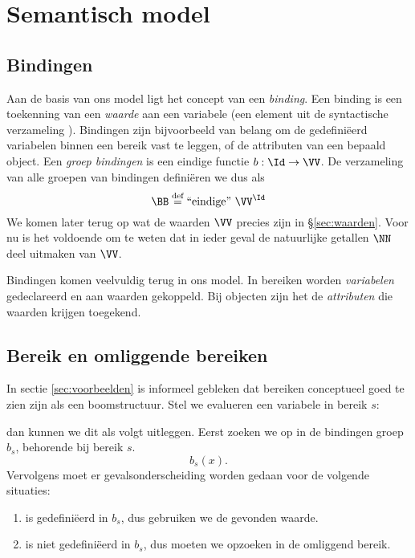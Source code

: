 \chapter{Semantisch model}

\section{Bindingen}\label{sec:bindingen}

Aan de basis van ons model ligt het concept van een \emph{binding}. Een binding is een toekenning van een \emph{waarde} aan een variabele (een element uit de syntactische verzameling \Id). Bindingen zijn bijvoorbeeld van belang om de gedefiniëerd variabelen binnen een bereik vast te leggen, of de attributen van een bepaald object. Een \emph{groep bindingen} is een eindige functie $b : \Id \to \VV$. De verzameling van alle groepen van bindingen definiëren we dus als
\begin{equation*}
  \BB \DEF \FiniteFunctions{\VV}{\Id}
\end{equation*}
We komen later terug op wat de waarden $\VV$ precies zijn in §\ref{sec:waarden}. Voor nu is het voldoende om te weten dat in ieder geval de natuurlijke getallen $\NN$ deel uitmaken van $\VV$.

Bindingen komen veelvuldig terug in ons model. In bereiken worden \emph{variabelen} gedeclareerd en aan waarden gekoppeld. Bij objecten zijn het de \emph{attributen} die waarden krijgen toegekend.

\section{Bereik en omliggende bereiken}

In sectie \ref{sec:voorbeelden} is informeel gebleken dat bereiken conceptueel goed te zien zijn als een boomstructuur. Stel we evalueren een variabele  in bereik $s$:

\newCodeFragment
{}

dan kunnen we dit als volgt uitleggen. Eerst zoeken we  op in de bindingen groep $b_s$, behorende bij bereik $s$.
%
\begin{equation*}
  b_s(x).
\end{equation*}
%
Vervolgens moet er gevalsonderscheiding worden gedaan voor de volgende situaties:

\begin{enumerate}
  \item {} is gedefiniëerd in $b_s$, dus gebruiken we de gevonden waarde.
  \item {} is niet gedefiniëerd in $b_s$, dus moeten we  opzoeken in de omliggend bereik.
\end{enumerate}

